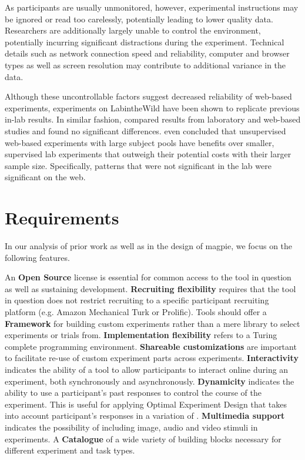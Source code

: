 \documentclass[a4paper,11pt]{scrreprt}
\begin{document}
As participants are usually unmonitored, however, experimental instructions may be ignored or read too carelessly, potentially leading to lower quality data. Researchers are additionally largely unable to control the environment, potentially incurring significant distractions during the experiment. Technical details such as network connection speed and reliability, computer and browser types as well as screen resolution may contribute to additional variance in the data.

Although these uncontrollable factors suggest decreased reliability of web-based experiments, experiments on LabintheWild have been shown to replicate previous in-lab results. \citep{Gajos2015} In similar fashion, \citet{Schoeffler2013} compared results from laboratory and web-based studies and found no significant differences. \citet{RRMWSC2013} even concluded that unsupervised web-based experiments with large subject pools have benefits over smaller, supervised lab experiments that outweigh their potential costs with their larger sample size. Specifically, patterns that were not significant in the lab were significant on the web.

\chapter{Requirements}
In our analysis of prior work as well as in the design of magpie, we focus on the following features.

An \textbf{Open Source} license is essential for common access to the tool in question as well as sustaining development. \textbf{Recruiting flexibility} requires that the tool in question does not restrict recruiting to a specific participant recruiting platform (e.g. Amazon Mechanical Turk or Prolific). Tools should offer a \textbf{Framework} for building custom experiments rather than a mere library to select experiments or trials from. \textbf{Implementation flexibility} refers to a Turing complete programming environment. \textbf{Shareable customizations} are important to facilitate re-use of custom experiment parts across experiments. \textbf{Interactivity} indicates the ability of a tool to allow participants to interact online during an experiment, both synchronously and asynchronously. \textbf{Dynamicity} indicates the ability to use a participant's past responses to control the course of the experiment. This is useful for applying Optimal Experiment Design that takes into account participant's responses in a variation of \citet{Ouyang2016}. \textbf{Multimedia support} indicates the possibility of including image, audio and video stimuli in experiments. A \textbf{Catalogue} of a wide variety of building blocks necessary for different experiment and task types.
\end{document}

